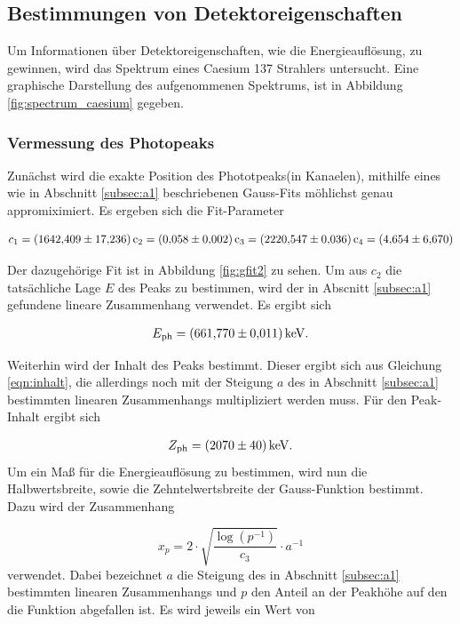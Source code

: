 \FloatBarrier

\subsection{Bestimmungen von Detektoreigenschaften}
\label{subsec:a2}
Um Informationen über Detektoreigenschaften, wie die Energieauflösung, zu gewinnen, wird das Spektrum eines Caesium 137 Strahlers untersucht. Eine graphische Darstellung des aufgenommenen
Spektrums, ist in Abbildung \ref{fig:spectrum_caesium} gegeben.

\subsubsection{Vermessung des Photopeaks}
\label{subsubsec:a21}
Zunächst wird die exakte Position des Phototpeaks(in Kanaelen), mithilfe eines wie in Abschnitt \ref{subsec:a1} beschriebenen Gauss-Fits
möhlichst genau appromiximiert. Es ergeben sich die Fit-Parameter

\begin{align*}
  c_{1} = \SI{1642.409+-17.236}
  c_{2} = \SI{0.058+-0.002}
  c_{3} = \SI{2220.547+-0.036}
  c_{4} = \SI{4.654+-6.670}.
\end{align*}

Der dazugehörige Fit ist in Abbildung \ref{fig:gfit2} zu sehen. Um aus $c_{2}$ die tatsächliche Lage $E$
des Peaks zu bestimmen, wird der in Abscnitt \ref{subsec:a1} gefundene lineare Zusammenhang verwendet.
Es ergibt sich

\begin{align*}
  E_{\text{ph}} = \SI{661.770+-0.011}{\kilo\electronvolt}.
\end{align*}

Weiterhin wird der Inhalt des Peaks bestimmt. Dieser ergibt sich aus Gleichung \eqref{eqn:inhalt}, die allerdings
noch mit der Steigung $a$ des in Abschnitt \ref{subsec:a1} bestimmten linearen Zusammenhangs multipliziert werden muss.
Für den Peak-Inhalt ergibt sich

\begin{align*}
  Z_\text{ph} = \SI{2070+-40}{\kilo\electronvolt}.
\end{align*}
Um ein Maß für die Energieauflösung zu bestimmen, wird nun die Halbwertsbreite, sowie die Zehntelwertsbreite
der Gauss-Funktion bestimmt.
Dazu wird der Zusammenhang

\begin{equation}
  \label{eqn:halbwertsbreite}
  x_{p} = 2 \cdot \sqrt{\frac{\log\left( p^{-1} \right)}{c_{3}}} \cdot a^{-1}
\end{equation}
verwendet. Dabei bezeichnet $a$ die Steigung des in Abschnitt \ref{subsec:a1} bestimmten linearen Zusammenhangs und
$p$ den Anteil an der Peakhöhe auf den die Funktion abgefallen ist.
Es wird jeweils ein Wert von


